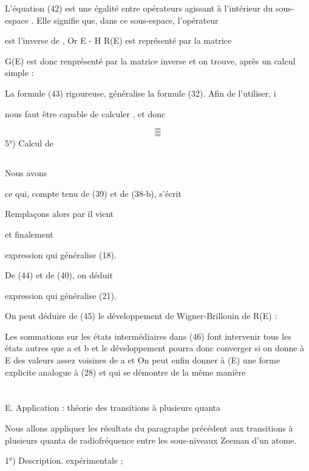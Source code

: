 L'équation (42) est une égalité entre opérateurs agissant à l'intérieur du
sous-espace . Elle signifie que, dans ce sous-espace, l'opérateur 

est l'inverse de , Or E - H R(E) est représenté par la matrice

G(E) est donc renprésenté par la matrice inverse et on trouve, après un calcul
simple : 

La formule (43) rigoureuse, généralise la formule (32). Afin de l'utiliser, i

nous faut être capable de calculer , et donc 


\[
\tag{45}=
\]
\[
\tag{46}=
\]
\[
\tag{47}=
\]
5°) Calcul de 

\subsection{}%
Nous avons

ce qui, compte tenu de (39) et de (38-b), s'écrit

Remplaçons alors  par  il vient

et finalement

expression qui généralise (18).

De (44) et de (40), on déduit

expression qui généralise (21).

On peut déduire de (45) le développement de Wigner-Brillouin de R(E) :

Les sommations sur les états intermédiaires dans (46) font intervenir tous les
états autres que a et b et le développement pourra donc converger si on donne
à E des valeurs assez voisines de a et
On peut enfin donner à (E) une forme explicite analogue à (28) et qui
se démontre de la même manière

\section{}
E. Application : théorie des transitions à plusieurs quanta

Nous allons appliquer les résultats du paragraphe précédent aux
transitions à plusieurs quanta de radiofréquence entre les sous-niveaux
Zeeman d'un atome.

1°) Description. expérimentale ;

